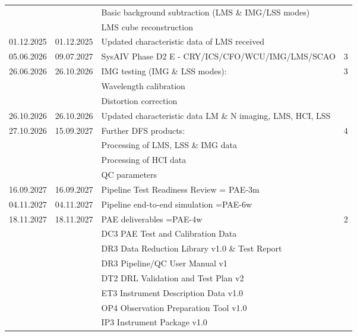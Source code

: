 \begin{table}[h!]
\begin{tabularx}{\textwidth}{llll}
    &          & Basic background subtraction (LMS \& IMG/LSS modes)          &	\\
    &          & LMS cube reconstruction                                      &	\\
\hline
01.12.2025 & 01.12.2025 &  Updated characteristic data of LMS received		  &   \\
05.06.2026 & 09.07.2027 & SysAIV Phase D2 E - CRY/ICS/CFO/WCU/IMG/LMS/SCAO            &   3 \\
26.06.2026 & 26.10.2026 & IMG testing (IMG \& LSS modes):                     &	3 \\
   &           & Wavelength calibration        	                           & \\   
   &           & Distortion correction                                        & \\
\hline
26.10.2026 & 26.10.2026 & Updated characteristic data LM \& N imaging, LMS, HCI, LSS      & 	\\
\hline
27.10.2026 & 15.09.2027 &	Further DFS products:		                      &	4 \\
    &          &  Processing of LMS, LSS \& IMG data                          &	\\
    &          &  Processing of HCI data                                      &	\\
    &          &  QC parameters					            &	\\
\hline
16.09.2027 & 16.09.2027 & Pipeline Test Readiness Review = PAE-3m			  &	\\
\hline
04.11.2027 & 04.11.2027 & Pipeline end-to-end simulation  =PAE-6w			  &	\\
\hline
18.11.2027 & 18.11.2027 & PAE deliverables =PAE-4w                            &	2 \\
    &          &  DC3 PAE Test and Calibration Data                           &	\\
    &          &  DR3 Data Reduction Library v1.0 \& Test Report              &	\\
    &          &  DR3 Pipeline/QC User Manual v1                              &	\\
    &	       &  DT2 DRL Validation and Test Plan v2                         &	\\
    &      	   &  ET3 Instrument Description Data v1.0                        &	\\
    &   	   &  OP4 Observation Preparation Tool v1.0                       &	\\
    &	   	   &  IP3 Instrument Package v1.0	                			  &	\\

\end{tabularx}
\end{table}
